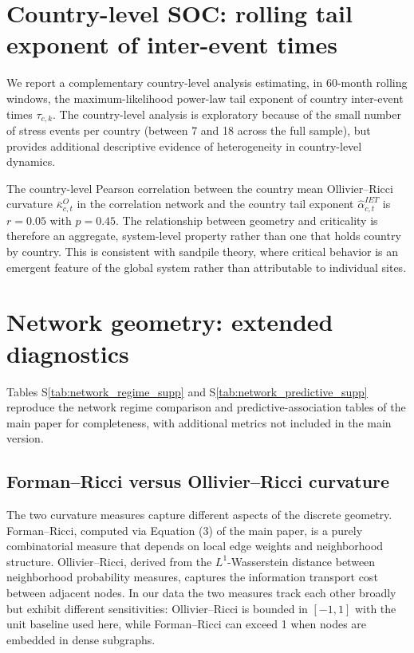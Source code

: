\documentclass[11pt,a4paper]{article}
\renewcommand{\thetable}{S\arabic{table}}
\begin{document}
\section{Country-level SOC: rolling tail exponent of inter-event times}
\label{sec:country_soc}

We report a complementary country-level analysis estimating, in 60-month
rolling windows, the maximum-likelihood power-law tail exponent of country
inter-event times $\tau_{c,k}$. The country-level analysis is exploratory
because of the small number of stress events per country (between 7 and 18
across the full sample), but provides additional descriptive evidence of
heterogeneity in country-level dynamics.

The country-level Pearson correlation between the country mean
Ollivier--Ricci curvature $\bar{\kappa}^O_{c,t}$ in the correlation network
and the country tail exponent $\hat{\alpha}^{IET}_{c,t}$ is $r=0.05$ with
$p=0.45$. The relationship between geometry and criticality is therefore an
aggregate, system-level property rather than one that holds country by
country. This is consistent with sandpile theory, where critical behavior is
an emergent feature of the global system rather than attributable to
individual sites.

\section{Network geometry: extended diagnostics}
\label{sec:network_appendix}

Tables S\ref{tab:network_regime_supp} and S\ref{tab:network_predictive_supp}
reproduce the network regime comparison and predictive-association tables of
the main paper for completeness, with additional metrics not included in the
main version.


\renewcommand{\thetable}{S\arabic{table}}\addtocounter{table}{-1}


\renewcommand{\thetable}{S\arabic{table}}\addtocounter{table}{-1}

\subsection{Forman--Ricci versus Ollivier--Ricci curvature}
The two curvature measures capture different aspects of the discrete
geometry. Forman--Ricci, computed via Equation (3) of the main paper, is a
purely combinatorial measure that depends on local edge weights and
neighborhood structure. Ollivier--Ricci, derived from the
$L^1$-Wasserstein distance between neighborhood probability measures,
captures the information transport cost between adjacent nodes. In our
data the two measures track each other broadly but exhibit different
sensitivities: Ollivier--Ricci is bounded in $[-1,1]$ with the unit
baseline used here, while Forman--Ricci can exceed 1 when nodes are
embedded in dense subgraphs.
\end{document}
